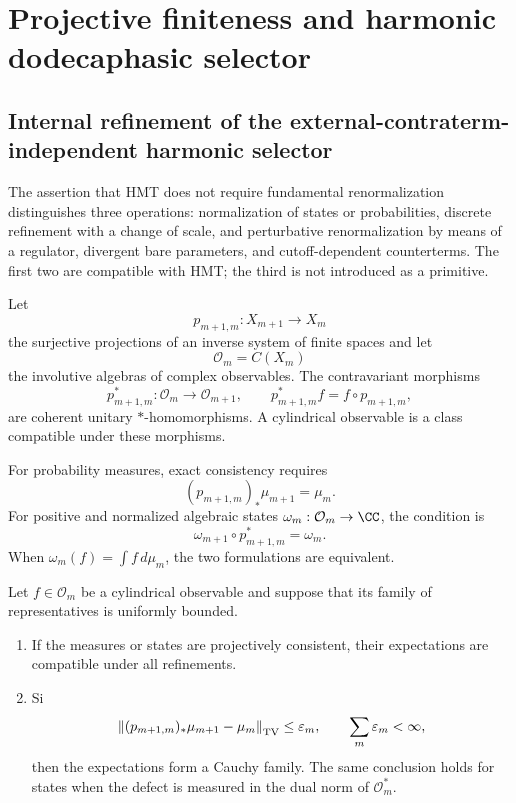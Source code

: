 \chapter{Projective finiteness and harmonic dodecaphasic selector}
\label{chap:finitud-anisotropia}

\section{Internal refinement of the external-contraterm-independent harmonic selector}
\label{sec:refinamiento-sin-contraterminos}

The assertion that HMT does not require fundamental renormalization distinguishes three operations: normalization of states or probabilities, discrete refinement with a change of scale, and perturbative renormalization by means of a regulator, divergent bare parameters, and cutoff-dependent counterterms. The first two are compatible with HMT; the third is not introduced as a primitive.

Let
\[
 p_{m+1,m}:X_{m+1}\longrightarrow X_m
\]
the surjective projections of an inverse system of finite spaces and
let
\[
 \mathcal O_m=C(X_m)
\]
the involutive algebras of complex observables. The contravariant morphisms
\[
 p_{m+1,m}^{\ast}:\mathcal O_m\longrightarrow\mathcal O_{m+1},
 \qquad
 p_{m+1,m}^{\ast}f=f\circ p_{m+1,m},
\]
are coherent unitary \(\ast\)-homomorphisms. A cylindrical observable is
a class compatible under these morphisms.

For probability measures, exact consistency requires
\[
 (p_{m+1,m})_\ast\mu_{m+1}=\mu_m.
\]
For positive and normalized algebraic states
\(\omega_m:\mathcal O_m\to\CC\), the condition is
\[
 \omega_{m+1}\circ p_{m+1,m}^{\ast}=\omega_m.
\]
When \(\omega_m(f)=\int f\,d\mu_m\), the two formulations are equivalent.

\begin{theorem}
\label{thm:compatibilidad-proyectiva-defectos}
Let \(f\in\mathcal O_m\) be a cylindrical observable and suppose that its family
of representatives is uniformly bounded.
\begin{enumerate}
 \item If the measures or states are projectively consistent, their
expectations are compatible under all refinements.
 \item Si
 \[
 \left\|(p_{m+1,m})_\ast\mu_{m+1}-\mu_m\right\|_{\rm TV}
 \leq\varepsilon_m,\qquad
 \sum_m\varepsilon_m<\infty,
 \]
 then the expectations form a Cauchy family. The same conclusion
 holds for states when the defect is measured in the dual norm of
 \(\mathcal O_m^\ast\).
\end{enumerate}
\end{theorem}

